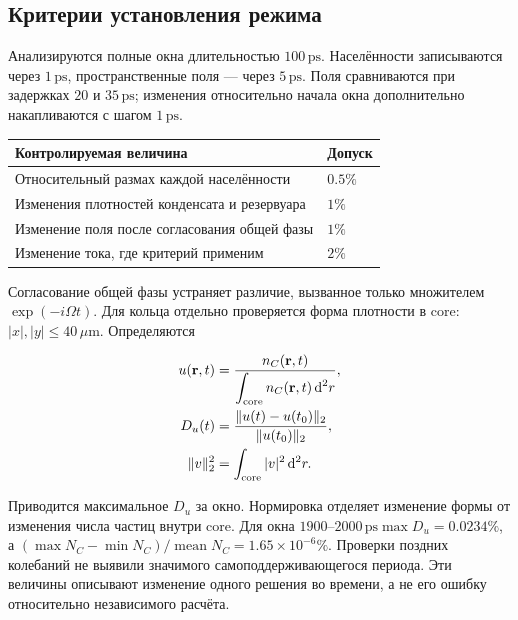 \documentclass[12pt,a4paper]{article}
\begin{document}
\subsection{Критерии установления режима}\label{sec:A.3}

Анализируются полные окна длительностью $100\,\mathrm{ps}$. Населённости записываются через $1\,\mathrm{ps}$, пространственные поля --- через $5\,\mathrm{ps}$. Поля сравниваются при задержках $20$ и $35\,\mathrm{ps}$; изменения относительно начала окна дополнительно накапливаются с шагом $1\,\mathrm{ps}$.

\begin{center}\begin{tabular}{>{\raggedright\arraybackslash}p{}>{\raggedright\arraybackslash}p{}}\toprule

\textbf{Контролируемая величина} & \textbf{Допуск}\\\midrule

Относительный размах каждой населённости & $0.5\%$\\

Изменения плотностей конденсата и резервуара & $1\%$\\

Изменение поля после согласования общей фазы & $1\%$\\

Изменение тока, где критерий применим & $2\%$\\

\bottomrule\end{tabular}\end{center}

Согласование общей фазы устраняет различие, вызванное только множителем $\exp(-i \Omega t)$. Для кольца отдельно проверяется форма плотности в $\mathrm{core}$: $|x|,|y|\le 40\,\mu\mathrm m$. Определяются

\[
\begin{aligned}u(\mathbf r,t)&=\frac{n_C(\mathbf r,t)}{\displaystyle\int_{\rm core}n_C(\mathbf r,t)\,\mathrm d^2r},\\D_u(t)&=\frac{\|u(t)-u(t_0)\|_2}{\|u(t_0)\|_2},\\\|v\|_2^2&=\int_{\rm core}|v|^2\,\mathrm d^2r.\end{aligned}
\]

Приводится максимальное $D_{u}$ за окно. Нормировка отделяет изменение формы от изменения числа частиц внутри $\mathrm{core}$. Для окна $1900\text{--}2000\,\mathrm{ps} \max D_{u}=0.0234\%$, а $(\max N_{C}-\min N_{C})/\operatorname{mean} N_{C}=1.65 \times 10^{-6}\%$. Проверки поздних колебаний не выявили значимого самоподдерживающегося периода. Эти величины описывают изменение одного решения во времени, а не его ошибку относительно независимого расчёта.
\end{document}
